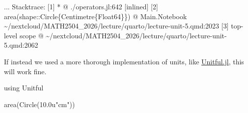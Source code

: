 \documentclass[
]{article}
\newenvironment{Shaded}{\begin{snugshade}}{\end{snugshade}}
\newcommand{\BuiltInTok}[1]{\textcolor[rgb]{0.00,0.23,0.31}{#1}}
\newcommand{\FloatTok}[1]{\textcolor[rgb]{0.68,0.00,0.00}{#1}}
\newcommand{\FunctionTok}[1]{\textcolor[rgb]{0.28,0.35,0.67}{#1}}
\newcommand{\ImportTok}[1]{\textcolor[rgb]{0.00,0.46,0.62}{#1}}
\newcommand{\NormalTok}[1]{\textcolor[rgb]{0.00,0.23,0.31}{#1}}
\newcommand{\StringTok}[1]{\textcolor[rgb]{0.13,0.47,0.30}{#1}}
\begin{document}
\begin{Highlighting}
\textcolor{QuartoInternalColor1}{}\textcolor{QuartoInternalColor1}{  ...}
\textcolor{QuartoInternalColor1}{Stacktrace:}
\textcolor{QuartoInternalColor1}{ [1] }\textcolor{QuartoInternalColor1}{}\textcolor{QuartoInternalColor1}{*}\textcolor{QuartoInternalColor1}{}
\textcolor{QuartoInternalColor1}{}\textcolor{QuartoInternalColor1}{   @}\textcolor{QuartoInternalColor1}{ }\textcolor{QuartoInternalColor1}{./}\textcolor{QuartoInternalColor1}{}\textcolor{QuartoInternalColor1}{}\textcolor{QuartoInternalColor1}{operators.jl:642}\textcolor{QuartoInternalColor1}{}\textcolor{QuartoInternalColor1}{}\textcolor{QuartoInternalColor1}{ [inlined]}\textcolor{QuartoInternalColor1}{}
\textcolor{QuartoInternalColor1}{ [2] }\textcolor{QuartoInternalColor1}{}\textcolor{QuartoInternalColor1}{area}\textcolor{QuartoInternalColor1}{}\textcolor{QuartoInternalColor1}{}\textcolor{QuartoInternalColor1}{(}\textcolor{QuartoInternalColor1}{}\textcolor{QuartoInternalColor1}{shape}\textcolor{QuartoInternalColor1}{::}\textcolor{QuartoInternalColor1}{Circle}\textcolor{QuartoInternalColor1}{\{Centimetre\{Float64\}\}}\textcolor{QuartoInternalColor1}{}\textcolor{QuartoInternalColor1}{}\textcolor{QuartoInternalColor1}{)}\textcolor{QuartoInternalColor1}{}
\textcolor{QuartoInternalColor1}{}\textcolor{QuartoInternalColor1}{   @}\textcolor{QuartoInternalColor1}{ }\textcolor{QuartoInternalColor2}{Main.Notebook}\textcolor{QuartoInternalColor1}{ }\textcolor{QuartoInternalColor1}{\textasciitilde{}/nextcloud/MATH2504\_2026/lecture/quarto/}\textcolor{QuartoInternalColor1}{}\textcolor{QuartoInternalColor1}{}\textcolor{QuartoInternalColor1}{lecture-unit-5.qmd:2023}\textcolor{QuartoInternalColor1}{}\textcolor{QuartoInternalColor1}{}
\textcolor{QuartoInternalColor1}{ [3] top-level scope}
\textcolor{QuartoInternalColor1}{}\textcolor{QuartoInternalColor1}{   @}\textcolor{QuartoInternalColor1}{ }\textcolor{QuartoInternalColor1}{\textasciitilde{}/nextcloud/MATH2504\_2026/lecture/quarto/}\textcolor{QuartoInternalColor1}{}\textcolor{QuartoInternalColor1}{}\textcolor{QuartoInternalColor1}{lecture-unit-5.qmd:2062}\textcolor{QuartoInternalColor1}{}\textcolor{QuartoInternalColor1}{}
\end{Highlighting}

If instead we used a more thorough implementation of units, like
\href{https://painterqubits.github.io/Unitful.jl/stable/}{Unitful.jl},
this will work fine.

\begin{Shaded}
\begin{Highlighting}[]
\ImportTok{using} \BuiltInTok{Unitful}

\FunctionTok{area}\NormalTok{(}\FunctionTok{Circle}\NormalTok{(}\FloatTok{10.0}\NormalTok{u}\StringTok{"cm"}\NormalTok{))}
\end{Highlighting}
\end{Shaded}
\end{document}
